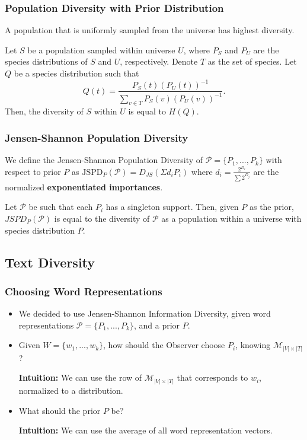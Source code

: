 \documentclass{beamer}
\newcommand\bet{\begin{Theorem}}
\newcommand\eet{\end{Theorem}}
\newcommand\bed{\begin{Definition}}
\newcommand\eed{\end{Definition}}
\newcommand\cP{{\mathcal P}}
\newcommand\cM{{\mathcal M}}
\begin{document}
\begin{frame}
\frametitle{Population Diversity with Prior Distribution}
\bet
A population that is uniformly sampled from the universe has
  highest diversity. 
\eet
\bet
Let $S$ be a population sampled within universe $U$, where $P_S$ and
$P_U$ are the species distributions of $S$ and $U$,
respectively. Denote $T$ as the set of species. Let $Q$ be a species
distribution such that
\[Q(t)=\frac{P_S(t)(P_U(t))^{-1}}{\sum_{v\in T} P_S(v)(P_U(v))^{-1}}.\]
Then, the diversity of $S$ within $U$ is equal to $H(Q)$.
\eet
\end{frame}

\begin{frame}
\frametitle{Jensen-Shannon Population Diversity}
\bed
We define the Jensen-Shannon Population Diversity of
$\cP=\{P_1,...,P_k\}$ with respect to prior $P$ as
$\mbox{JSPD}_P(\cP)=D_{JS}(\Sigma d_i P_i)$ 
where $d_{i}=\frac{2^{D_{i}}}{\sum 2^{D_{j}}}$ are the normalized
{\bf exponentiated importances}.
\eed
\bet
Let $\cP$ be such that each $P_i$ has a singleton support. Then, given
$P$ as the 
prior,  $JSPD_P(\cP)$ is equal to the diversity of $\cP$ as a
population within a universe with species distribution $P$.
\eet
\end{frame}

\subsection{Text Diversity}

\begin{frame}
\frametitle{Choosing Word Representations}
\begin{itemize}
\item We decided to use Jensen-Shannon Information Diversity, given
  word representations $\cP=\{P_1,...,P_k\}$, and a prior $P$.
\item Given $W=\{w_1,...,w_k\}$, how should the Observer choose $P_{i}$, knowing
  $\cM_{|V|\times|T|}$?

{\bf Intuition:} We can use the row of $\cM_{|V|\times|T|}$ that
corresponds to $w_i$, normalized to a distribution.
\item What should the prior $P$ be?

{\bf Intuition:} We can use the average of all word representation vectors.
\end{itemize}
\end{frame}
\end{document}
